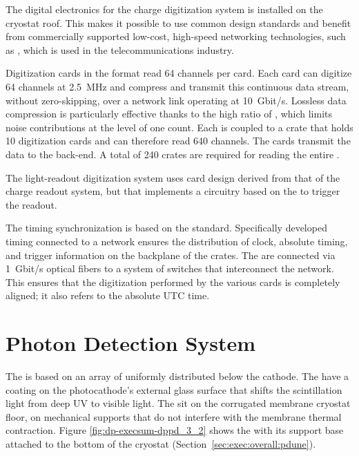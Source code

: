 The digital electronics for the charge digitization system is installed on the cryostat roof. 
This makes it possible to use common design standards and benefit from commercially supported low-cost, high-speed networking technologies, such as , which is used in the telecommunications industry.

Digitization cards in the  format read \num{64} channels per card. Each  card can digitize \num{64} channels at \SI{2.5}{MHz} and compress and transmit this continuous data stream, without zero-skipping, over a network link operating at \SI{10}{Gbit/s}. Lossless data compression is particularly effective thanks to the high  ratio  of , which limits noise contributions at the level of one  count. Each  is coupled to a  crate that holds \num{10}  digitization cards and can therefore read  \num{640} channels. The  cards  transmit the data to the  back-end. A total of \num{240}  crates are required for reading the entire .  

The light-readout digitization system uses   card design derived from that of the charge readout system, but that implements a circuitry based on the   to trigger the readout. 

The timing synchronization is based on the  standard. Specifically developed timing  connected to a  network ensures the distribution of clock, absolute timing, and trigger information on the backplane of the  crates. The  are connected via \SI{1}{Gbit/s} optical fibers to a system of  switches that interconnect the  network. This ensures that the digitization performed by the various  cards is completely aligned; it also refers to the absolute UTC time. 



\section{Photon Detection System}
\label{sec:dp-execsum-pd}

The  is based on an array of  uniformly distributed below the cathode. 
The  have a  coating on the photocathode's external glass surface that shifts the scintillation light from deep UV to visible light. The   sit on the corrugated membrane cryostat floor, on 
mechanical supports that do not interfere with the membrane thermal contraction. 
Figure \ref{fig:dp-execsum-dppd_3_2} shows the  with its support base attached to the bottom of the  cryostat (Section~\ref{sec:exec:overall:pdune}).

